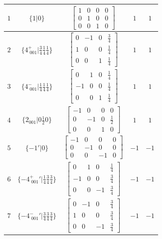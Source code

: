 \documentclass[fleqn,8pt]{jsarticle}
\begin{document}
\begin{longtable}{ccccc}
$ 1 $ & $ \{1|0\} $ & $ \begin{bmatrix} 1 & 0 & 0 & 0 \\ 0 & 1 & 0 & 0 \\ 0 & 0 & 1 & 0 \end{bmatrix} $ & $ 1 $ & $ 1 $ \\ \hline
$ 2 $ & $ \{4^{+}_{\,\,001}|\frac{3}{4} \frac{1}{4} \frac{1}{4}\} $ & $ \begin{bmatrix} 0 & -1 & 0 & \frac{3}{4} \\ 1 & 0 & 0 & \frac{1}{4} \\ 0 & 0 & 1 & \frac{1}{4} \end{bmatrix} $ & $ 1 $ & $ 1 $ \\ \hline
$ 3 $ & $ \{4^{-}_{\,\,001}|\frac{1}{4} \frac{1}{4} \frac{1}{4}\} $ & $ \begin{bmatrix} 0 & 1 & 0 & \frac{1}{4} \\ -1 & 0 & 0 & \frac{1}{4} \\ 0 & 0 & 1 & \frac{1}{4} \end{bmatrix} $ & $ 1 $ & $ 1 $ \\ \hline
$ 4 $ & $ \{2{}_{001}|0 \frac{1}{2} 0\} $ & $ \begin{bmatrix} -1 & 0 & 0 & 0 \\ 0 & -1 & 0 & \frac{1}{2} \\ 0 & 0 & 1 & 0 \end{bmatrix} $ & $ 1 $ & $ 1 $ \\ \hline
$ 5 $ & $ \{-1{}'|0\} $ & $ \begin{bmatrix} -1 & 0 & 0 & 0 \\ 0 & -1 & 0 & 0 \\ 0 & 0 & -1 & 0 \end{bmatrix} $ & $ -1 $ & $ -1 $ \\ \hline
$ 6 $ & $ \{-4^{+}_{\,\,001}{}'|\frac{1}{4} \frac{3}{4} \frac{3}{4}\} $ & $ \begin{bmatrix} 0 & 1 & 0 & \frac{1}{4} \\ -1 & 0 & 0 & \frac{3}{4} \\ 0 & 0 & -1 & \frac{3}{4} \end{bmatrix} $ & $ -1 $ & $ -1 $ \\ \hline
$ 7 $ & $ \{-4^{-}_{\,\,001}{}'|\frac{3}{4} \frac{3}{4} \frac{3}{4}\} $ & $ \begin{bmatrix} 0 & -1 & 0 & \frac{3}{4} \\ 1 & 0 & 0 & \frac{3}{4} \\ 0 & 0 & -1 & \frac{3}{4} \end{bmatrix} $ & $ -1 $ & $ -1 $ \\ \hline

\end{longtable}
\end{document}
